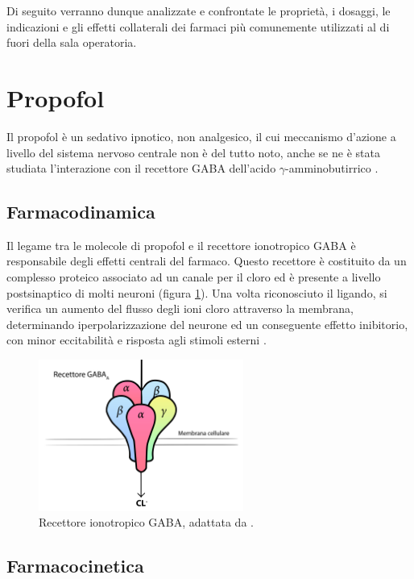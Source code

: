 Di seguito verranno dunque analizzate e confrontate le proprietà, i dosaggi, le indicazioni e gli effetti collaterali dei farmaci più comunemente utilizzati al di fuori della sala operatoria. 

\section{Propofol}

Il propofol è un sedativo ipnotico, non analgesico, il cui meccanismo d'azione a livello del sistema nervoso centrale non è del tutto noto, anche se ne è stata studiata l'interazione con il recettore GABA dell'acido $\gamma$-amminobutirrico \cite{Propofol2015}.

\subsection*{Farmacodinamica}

Il legame tra le molecole di propofol e il recettore ionotropico GABA è responsabile degli effetti centrali del farmaco. Questo recettore è costituito da un complesso proteico associato ad un canale per il cloro ed è presente a livello postsinaptico di molti neuroni (figura \ref{fig:GABAps}). Una volta riconosciuto il ligando, si verifica un aumento del flusso degli ioni cloro attraverso la membrana, determinando iperpolarizzazione del neurone ed un conseguente effetto inibitorio, con minor eccitabilità e risposta agli stimoli esterni \cite{Propofol2015}.

\begin{figure}[]
    \centering
    \includegraphics[width=0.6\textwidth]{Figure/GABAps.jpg}
    \caption{Recettore ionotropico GABA, adattata da \cite{vinkers2012}.}
    \label{fig:GABAps}
\end{figure}

\subsection*{Farmacocinetica}

